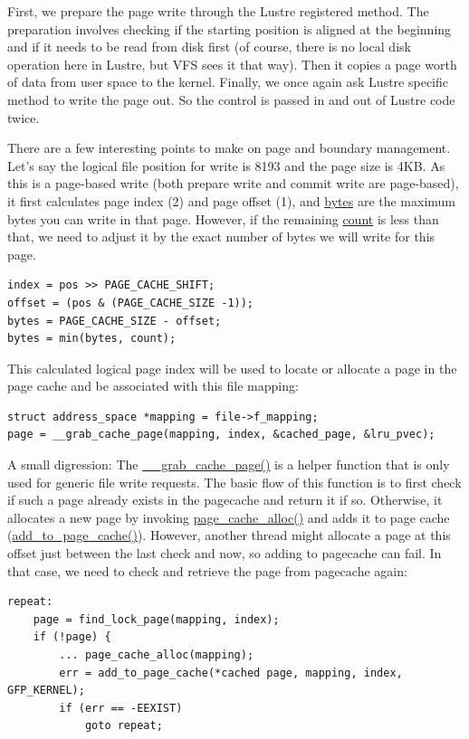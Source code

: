 \begin{enumerate}
First, we prepare the page write through the Lustre registered method. The
preparation involves checking if the starting position is aligned at the
beginning and if it needs to be read from disk first (of course, there is no
local disk operation here in Lustre, but VFS sees it that way). Then it copies
a page worth of data from user space to the kernel. Finally, we once again ask
Lustre specific method to write the page out. So the control is passed in and
out of Lustre code twice.

There are a few interesting points to make on page and boundary management. Let's
say the logical file position for write is 8193 and the page size is 4KB. As
this is a page-based write (both prepare write and commit write are
page-based), it first calculates page index (2) and page offset (1), and
\url{bytes} are the maximum bytes you can write in that page.  However, if the
remaining \url{count} is less than that, we need to adjust it by the exact
number of bytes we will write for this page.

\begin{Verbatim}
index = pos >> PAGE_CACHE_SHIFT;
offset = (pos & (PAGE_CACHE_SIZE -1));
bytes = PAGE_CACHE_SIZE - offset;
bytes = min(bytes, count);
\end{Verbatim}

This calculated logical page index will be used to locate or allocate a page in
the page cache and be associated with this file mapping:

\begin{Verbatim}
struct address_space *mapping = file->f_mapping;
page = __grab_cache_page(mapping, index, &cached_page, &lru_pvec);
\end{Verbatim}

A small digression: The \url{__grab_cache_page()} is a helper function that
is only used for generic file write requests.  The basic flow of this function
is to first check if such a page already exists in the pagecache and return it
if so.  Otherwise, it allocates a new page by invoking
\url{page_cache_alloc()} and adds it to page cache
(\url{add_to_page_cache()}). However, another thread might
allocate a page at this offset just between the last check and now, so adding
to pagecache can fail. In that case, we need to check and retrieve the page
from pagecache again:

\begin{Verbatim}
repeat:
    page = find_lock_page(mapping, index);
    if (!page) {
        ... page_cache_alloc(mapping);
        err = add_to_page_cache(*cached page, mapping, index, GFP_KERNEL);
        if (err == -EEXIST)
            goto repeat;
\end{Verbatim}


\end{enumerate}
